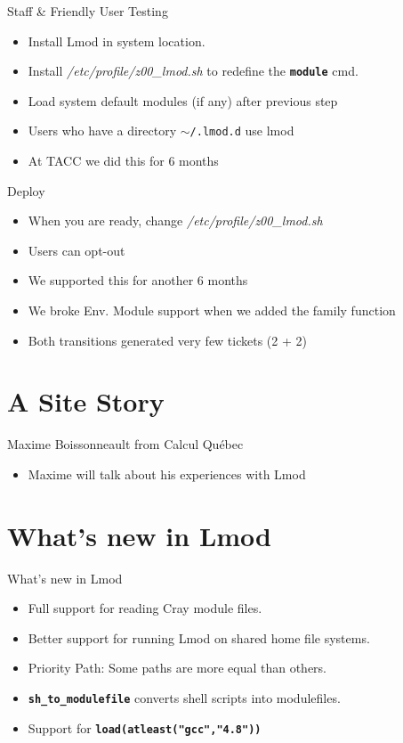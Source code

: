 \documentclass{beamer}
\begin{document}
\begin{frame}{Staff \& Friendly User Testing}
  \begin{itemize}
    \item Install Lmod in system location.
    \item Install \emph{/etc/profile/z00\_lmod.sh} to redefine the
      \texttt{\bf module} cmd.
    \item Load system  default modules (if any) after previous step
    \item Users who have a directory \texttt{$\sim$/.lmod.d} use lmod
    \item At TACC we did this for 6 months
  \end{itemize}
\end{frame}

\begin{frame}{Deploy}
  \begin{itemize}
    \item When you are ready, change \emph{/etc/profile/z00\_lmod.sh}
    \item Users can opt-out
    \item We supported this for another 6 months
    \item We broke Env. Module support when we added the family function
    \item Both transitions generated very few tickets (2 + 2)
  \end{itemize}
\end{frame}


\section{A Site Story}

\begin{frame}{Maxime Boissonneault from Calcul Qu\'{e}bec}
  \begin{itemize}
      \item Maxime will talk about his experiences with Lmod
  \end{itemize}
\end{frame}


\section{What's new in Lmod}

\begin{frame}{What's new in Lmod}
  \begin{itemize}
      \item Full support for reading Cray module files.
      \item Better support for running Lmod on shared home file systems.
      \item Priority Path: Some paths are more equal than others.
      \item \texttt{\bf sh\_to\_modulefile} converts shell scripts into modulefiles.
      \item Support for \texttt{\bf load(atleast("gcc","4.8"))}
  \end{itemize}
\end{frame}
\end{document}
